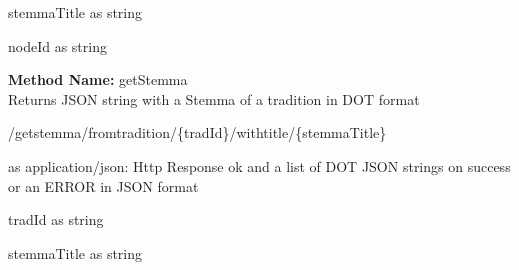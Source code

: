\begin{parameter}
stemmaTitle as string
\end{parameter}
\begin{parameter}
nodeId as string
\end{parameter}
\textbf{Method Name: }getStemma \\ Returns JSON string with a Stemma of a tradition in DOT format
\begin{get}
/getstemma/fromtradition/\{tradId\}/withtitle/\{stemmaTitle\}
\end{get}
\begin{response}
 as application/json: Http Response ok and a list of DOT JSON strings on success or an ERROR in JSON format
\end{response}
\begin{parameter}
tradId as string
\end{parameter}
\begin{parameter}
stemmaTitle as string
\end{parameter}
